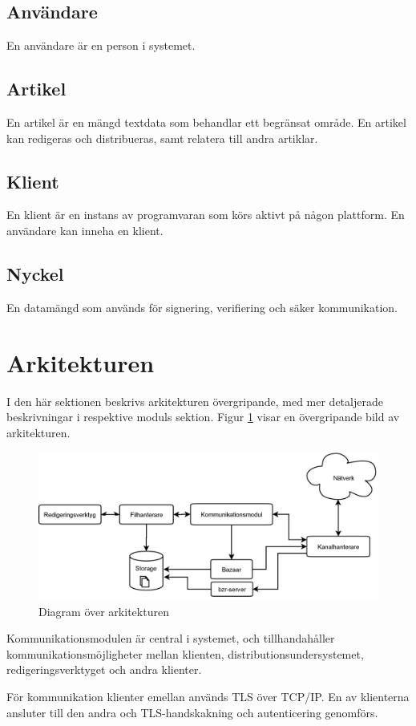 \subsection*{Användare}
En användare är en person i systemet. 
\subsection*{Artikel}
En artikel är en mängd textdata som behandlar ett begränsat område. En artikel kan redigeras och distribueras, samt relatera till andra artiklar.
\subsection*{Klient}
En klient är en instans av programvaran som körs aktivt på någon
plattform. En användare kan inneha en klient.
\subsection*{Nyckel}
En datamängd som används för signering, verifiering och säker kommunikation.
\section{Arkitekturen}
I den här sektionen beskrivs arkitekturen övergripande, med mer
detaljerade beskrivningar i respektive moduls sektion. Figur \ref{fig1} visar en övergripande bild av arkitekturen.

\begin{figure}[ht]
  \includegraphics[width=160mm]{Architecture-diagram.png}
  \caption{Diagram över arkitekturen}
  \label{fig1}
\end{figure}

Kommunikationsmodulen är central i systemet, och tillhandahåller
kommunikationsmöjligheter mellan klienten,
distributionsundersystemet, redigeringsverktyget och andra klienter.

För kommunikation klienter emellan används TLS över TCP/IP. En av
klienterna ansluter till den andra och TLS-handskakning och
autenticering genomförs.

